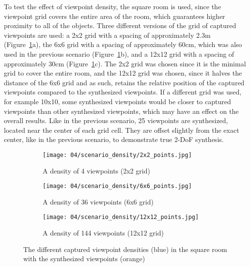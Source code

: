 To test the effect of viewpoint density, the square room is used, since the viewpoint grid covers the entire area of the room, which guarantees higher proximity to all of the objects. Three different versions of the grid of captured viewpoints are used: a 2x2 grid with a spacing of approximately 2.3m (Figure~\ref{fig:density_setup}a), the 6x6 grid with a spacing of approximately 60cm, which was also used in the previous scenario (Figure~\ref{fig:density_setup}b), and a 12x12 grid with a spacing of approximately 30cm (Figure~\ref{fig:density_setup}c). The 2x2 grid was chosen since it is the minimal grid to cover the entire room, and the 12x12 grid was chosen, since it halves the distance of the 6x6 grid and as such, retains the relative position of the captured viewpoints compared to the synthesized viewpoints. If a different grid was used, for example 10x10, some synthesized viewpoints would be closer to captured viewpoints than other synthesized viewpoints, which may have an effect on the overall results.
Like in the previous scenario, 25 viewpoints are synthesized, located near the center of each grid cell. They are offset slightly from the exact center, like in the previous scenario, to demonstrate true 2-DoF synthesis.

\begin{figure}
\centering
    \hfill
    \begin{subfigure}[t]{0.3\textwidth}
            \centering
            \texttt{[image: 04/scenario\_density/2x2\_points.jpg]}
            \caption{A density of 4 viewpoints (2x2 grid)}
    \end{subfigure}
    \hfill
    \begin{subfigure}[t]{0.3\textwidth}
            \centering
            \texttt{[image: 04/scenario\_density/6x6\_points.jpg]}
            \caption{A density of 36 viewpoints (6x6 grid)}
    \end{subfigure}
    \hfill
    \begin{subfigure}[t]{0.3\textwidth}
            \centering
            \texttt{[image: 04/scenario\_density/12x12\_points.jpg]}
            \caption{A density of 144 viewpoints (12x12 grid)}
    \end{subfigure}
    \hfill
  \caption[The different captured viewpoint densities in the square room]{The different captured viewpoint densities (blue) in the square room with the synthesized viewpoints (orange)} \label{fig:density_setup}
\end{figure}

